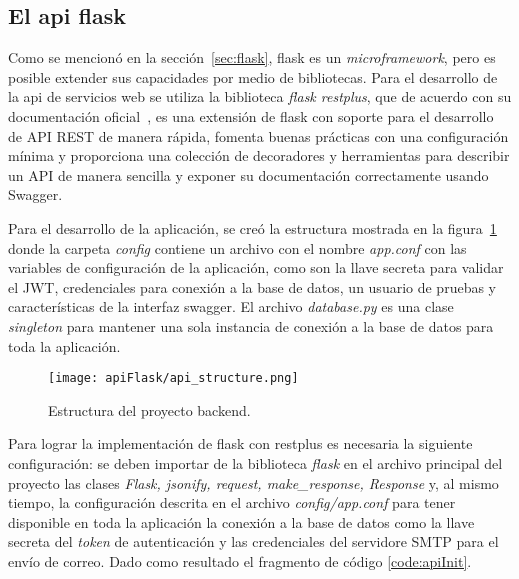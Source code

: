 \subsection{El api flask} \label{sec:apiFlask}

Como se mencionó en la sección~\ref{sec:flask}, flask es un \textit{microframework}, pero es posible extender sus capacidades por medio de bibliotecas. Para el desarrollo de la api de servicios web se utiliza la biblioteca \textit{flask restplus}, que de acuerdo con su documentación oficial~\cite{noauthor_flask-restplus_2020}, es una extensión de flask con soporte para el desarrollo de API REST de manera rápida, fomenta buenas prácticas con una configuración mínima y proporciona una colección de decoradores y herramientas para describir un API de manera sencilla y exponer su documentación correctamente usando Swagger.

Para el desarrollo de la aplicación, se creó la estructura mostrada en la figura~\ref{img:backStructure} donde la carpeta \textit{config} contiene un archivo con el nombre \textit{app.conf} con las variables de configuración de la aplicación, como son la llave secreta para validar el JWT, credenciales para conexión a la base de datos, un usuario de pruebas y características de la interfaz swagger. El archivo \textit{database.py} es una clase \textit{singleton} para mantener una sola instancia de conexión a la base de datos para toda la aplicación.

\begin{figure}[H]
  \centering
  \texttt{[image: apiFlask/api\_structure.png]}
  \caption{Estructura del proyecto backend.}
  \label{img:backStructure}
\end{figure}

Para lograr la implementación de flask con restplus es necesaria la siguiente configuración: se deben importar de la biblioteca \textit{flask} en el archivo principal del proyecto las clases \textit{Flask, jsonify, request, make\_response, Response} y, al mismo tiempo, la configuración descrita en el archivo \textit{config/app.conf} para tener disponible en toda la aplicación la conexión a la base de datos como la llave secreta del \textit{token} de autenticación y las credenciales del servidore SMTP para el envío de correo. Dado como resultado el fragmento de código \ref{code:apiInit}.

